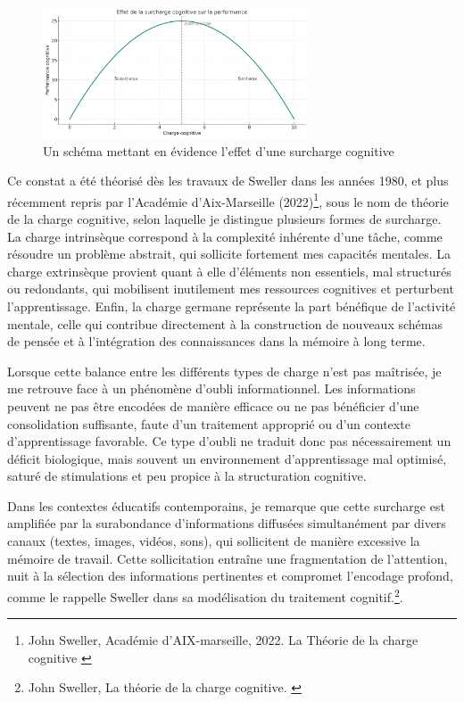 \documentclass[11pt,a4paper]{report}
\begin{document}
\begin{figure}[h]
    \centering
    \includegraphics[width=0.7\textwidth]{images/1.2.3_2.png}
    \caption{Un schéma mettant en évidence l’effet d’une surcharge cognitive}
    \label{fig:1.2.3}
\end{figure}

Ce constat a été théorisé dès les travaux de Sweller dans les années 1980, et plus récemment repris par l’Académie d’Aix-Marseille (2022)\footnote{John Sweller, Académie d'AIX-marseille, 2022. La Théorie de la charge cognitive \cite{sweller}}, sous le nom de théorie de la charge cognitive, selon laquelle je distingue plusieurs formes de surcharge. La charge intrinsèque correspond à la complexité inhérente d’une tâche, comme résoudre un problème abstrait, qui sollicite fortement mes capacités mentales. La charge extrinsèque provient quant à elle d’éléments non essentiels, mal structurés ou redondants, qui mobilisent inutilement mes ressources cognitives et perturbent l’apprentissage. Enfin, la charge germane représente la part bénéfique de l’activité mentale, celle qui contribue directement à la construction de nouveaux schémas de pensée et à l’intégration des connaissances dans la mémoire à long terme.

Lorsque cette balance entre les différents types de charge n’est pas maîtrisée, je me retrouve face à un phénomène d’oubli informationnel. Les informations peuvent ne pas être encodées de manière efficace ou ne pas bénéficier d’une consolidation suffisante, faute d’un traitement approprié ou d’un contexte d’apprentissage favorable. Ce type d’oubli ne traduit donc pas nécessairement un déficit biologique, mais souvent un environnement d’apprentissage mal optimisé, saturé de stimulations et peu propice à la structuration cognitive.

Dans les contextes éducatifs contemporains, je remarque que cette surcharge est amplifiée par la surabondance d’informations diffusées simultanément par divers canaux (textes, images, vidéos, sons), qui sollicitent de manière excessive la mémoire de travail. Cette sollicitation entraîne une fragmentation de l’attention, nuit à la sélection des informations pertinentes et compromet l’encodage profond, comme le rappelle Sweller dans sa modélisation du traitement cognitif.\footnote{John Sweller, La théorie de la charge cognitive. \cite{sweller2}}.
\end{document}

